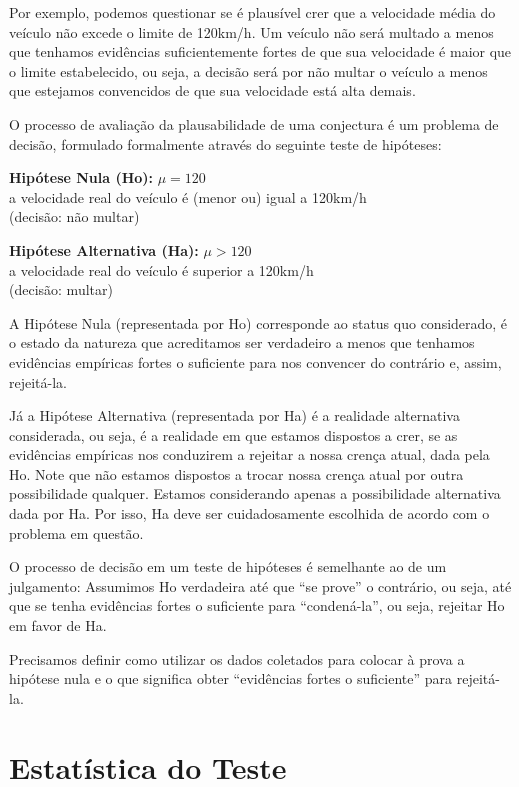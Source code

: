 \documentclass[
]{book}
\theoremstyle{definition}
\theoremstyle{definition}
\theoremstyle{definition}
\theoremstyle{remark}
\begin{document}
Por exemplo, podemos questionar se é plausível crer que a velocidade média do veículo não excede o limite de 120km/h. Um veículo não será multado a menos que tenhamos evidências suficientemente fortes de que sua velocidade é maior que o limite estabelecido, ou seja, a decisão será por não multar o veículo a menos que estejamos convencidos de que sua velocidade está alta demais.

O processo de avaliação da plausabilidade de uma conjectura é um problema de decisão, formulado formalmente através do seguinte teste de hipóteses:

\textbf{Hipótese Nula (Ho):} \(\mu = 120\)\\
a velocidade real do veículo é (menor ou) igual a 120km/h\\
(decisão: não multar)

\textbf{Hipótese Alternativa (Ha):} \(\mu > 120\)\\
a velocidade real do veículo é superior a 120km/h\\
(decisão: multar)

A Hipótese Nula (representada por Ho) corresponde ao status quo considerado, é o estado da natureza que acreditamos ser verdadeiro a menos que tenhamos evidências empíricas fortes o suficiente para nos convencer do contrário e, assim, rejeitá-la.

Já a Hipótese Alternativa (representada por Ha) é a realidade alternativa considerada, ou seja, é a realidade em que estamos dispostos a crer, se as evidências empíricas nos conduzirem a rejeitar a nossa crença atual, dada pela Ho. Note que não estamos dispostos a trocar nossa crença atual por outra possibilidade qualquer. Estamos considerando apenas a possibilidade alternativa dada por Ha. Por isso, Ha deve ser cuidadosamente escolhida de acordo com o problema em questão.

O processo de decisão em um teste de hipóteses é semelhante ao de um julgamento:
Assumimos Ho verdadeira até que ``se prove'' o contrário, ou seja, até que se tenha evidências fortes o suficiente para ``condená-la'', ou seja, rejeitar Ho em favor de Ha.

Precisamos definir como utilizar os dados coletados para colocar à prova a hipótese nula e o que significa obter ``evidências fortes o suficiente'' para rejeitá-la.

\hypertarget{estatuxedstica-do-teste}{%
\section{Estatística do Teste}\label{estatuxedstica-do-teste}}
\end{document}
